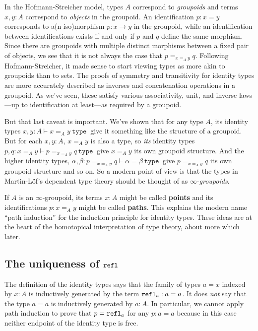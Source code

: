 \documentclass{amsart}
\theoremstyle{theorem}
\theoremstyle{definition}
\theoremstyle{remark}
\newcommand{\0}{\mathbbe{0}}
\newcommand{\1}{\mathbbe{1}}
\newcommand{\2}{\mathbbe{2}}
\newcommand{\3}{\mathbbe{3}}
\newcommand{\4}{\mathbbe{4}}
\newcommand{\univ}{{~\texttt{type}~}}
\newcommand{\term}[1]{{\textup{\texttt{#1}}}}
\newcommand{\refl}{\term{refl}}
\begin{document}
In the Hofmann-Streicher model, types $A$ correspond to \emph{groupoids} and terms $x, y : A$ correspond to \emph{objects} in the groupoid. An identification $p : x = y$ corresponds to a(n iso)morphism $p : x \to y$ in the groupoid, while an identification between identifications exists if and only if $p$ and $q$ define the same morphism. Since there are groupoids with multiple distinct morphisms between a fixed pair of objects, we see that it is not always the case that $p=_{x=_A y} q$. Following Hofmann-Streicher, it made sense to start viewing types as more akin to groupoids than to sets. The proofs of symmetry and transitivity for identity types are more accurately described as inverses and concatenation operations in a groupoid. As we've seen, these satisfy various associativity, unit, and inverse laws---up to identification at least---as required by a groupoid.

But that last caveat is important. We've shown that for any type $A$, its identity types $x,y :A \vdash x=_A y \univ$ give it something like the structure of a groupoid. But for each $x,y :A$, $x=_A y$ is also a type, so \emph{its} identity types $p,q: x=_A y \vdash p =_{x=_A y}q \univ$ give $x=_A y$ its own groupoid structure. And the higher identity types, $\alpha, \beta : p =_{x=_A y}q  \vdash \alpha= \beta \univ$ give $p =_{x=_A y}q$ its own groupoid structure and so on. So a modern point of view is that the types in Martin-L\"{o}f's dependent type theory should be thought of as $\infty$-\emph{groupoids}.

If $A$ is an $\infty$-groupoid, its terms $x :A$ might be called \textbf{points} and its identifications $p : x =_A y$ might be called \textbf{paths}. This explains the modern name ``path induction'' for the induction principle for identity types. These ideas are at the heart of the homotopical interpretation of type theory, about more which later.

\subsection*{The uniqueness of \texorpdfstring{$\refl$}{refl}}

The definition of the identity types says that the family of types $a =x$ indexed by $x : A$ is inductively generated by the term $\refl_a : a = a$. It does \emph{not} say that the type $a =a$ is inductively generated by $a : A$. In particular, we cannot apply path induction to prove that $p = \refl_a$ for any $p : a = a$ because in this case neither endpoint of the identity type is free. 
\end{document}
